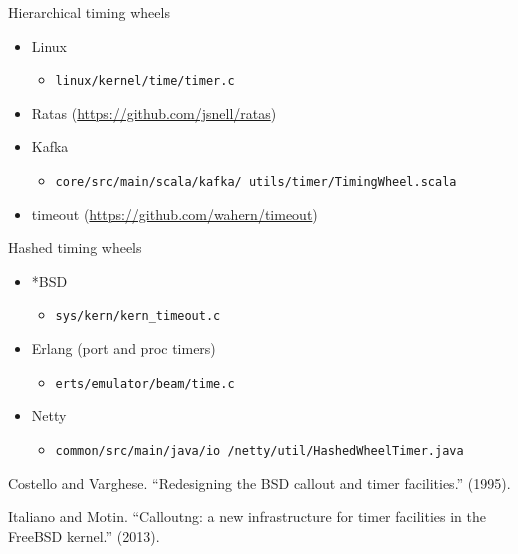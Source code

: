 \documentclass{beamer}
\begin{document}
\begin{frame}{Hierarchical timing wheels}
  \begin{itemize}
  \item Linux
    \begin{itemize}
    \item \texttt{linux/kernel/time/timer.c}
    \end{itemize}
  \item Ratas (\hyperlink{https://github.com/jsnell/ratas}{https://github.com/jsnell/ratas})
  \item Kafka
    \begin{itemize}
    \item \texttt{core/src/main/scala/kafka/ utils/timer/TimingWheel.scala}
    \end{itemize}
  \item timeout (\hyperlink{https://github.com/wahern/timeout}{https://github.com/wahern/timeout})
  \end{itemize}
\end{frame}




\begin{frame}{Hashed timing wheels}
  \begin{itemize}
  \item *BSD\
    \begin{itemize}
    \item \texttt{sys/kern/kern\_timeout.c}
    \end{itemize}
  \item Erlang (port and proc timers)
    \begin{itemize}
    \item \texttt{erts/emulator/beam/time.c}
    \end{itemize}
  \item Netty
    \begin{itemize}
    \item \texttt{common/src/main/java/io /netty/util/HashedWheelTimer.java}
    \end{itemize}
  \end{itemize}

  \vspace{1.5em} Costello and Varghese. ``Redesigning the BSD callout
  and timer facilities.'' (1995).

  \vspace{1em} Italiano and Motin. ``Calloutng: a new infrastructure
  for timer facilities in the FreeBSD kernel.'' (2013).
\end{frame}
\end{document}
